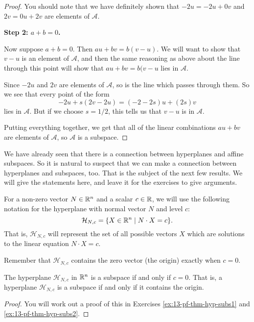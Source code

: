 \documentclass[elementsmain.tex]{subfiles}
\begin{document}
\begin{proof}
You should note that we have definitely shown that $-2u = -2u + 0v$ and $2v = 0u+2v$ are elements of $\mathcal{A}$.

\noindent
\textbf{Step 2: $a+b=0$.}

Now suppose $a+b=0$. Then $au+bv = b (v-u)$. We will want to show that $v-u$ is an element of $\mathcal{A}$, and then the same reasoning as above about the line through this point will show that $au+bv = b(v-u$ lies in $\mathcal{A}$. 

Since $-2u$ and $2v$ are elements of $\mathcal{A}$, so is the line which passes through them. So we see that every point of the form
\[
-2u + s (2v-2u) = (-2-2s) u + (2s) v 
\]
lies in $\mathcal{A}$. But if we choose $s=1/2$, this tells us that $v-u$ is in $\mathcal{A}$.

Putting everything together, we get that all of the linear combinations $au+bv$ are elements of $\mathcal{A}$, so $\mathcal{A}$ is a subspace.
\end{proof}

We have already seen that there is a connection between hyperplanes and affine subspaces. So it is natural to suspect that we can make a connection between hyperplanes and subspaces, too. That is the subject of the next few results. We will give the statements here, and leave it for the exercises to give arguments. 

\begin{remark} For a non-zero vector $N\in \mathbb{R}^n$ and a scalar $c\in \mathbb{R}$, we will use the following notation for the hyperplane with normal vector $N$ and level $c$:
\[
\mathcal{H}_{N,c} = \{  X \in \mathbb{R}^n \mid N\cdot X = c \}.
\]
That is, $\mathcal{H}_{N,c}$ will represent the set of all possible vectors $X$ which are solutions to the linear equation $N\cdot X = c$.

Remember that $\mathcal{H}_{N,c}$ contains the zero vector (the origin) exactly when $c=0$.
\end{remark}


\begin{theorem}\label{thm:13-hyp-subs} The hyperplane $\mathcal{H}_{N,c}$ in $\mathbb{R}^n$ is a subspace if and only if $c=0$. That is, a hyperplane $\mathcal{H}_{N,c}$ is a subspace if and only if it contains the origin.
\end{theorem}

\begin{proof} You will work out a proof of this in Exercises \ref{ex:13-pf-thm-hyp-subs1} and \ref{ex:13-pf-thm-hyp-subs2}.
\end{proof}
\end{document}
